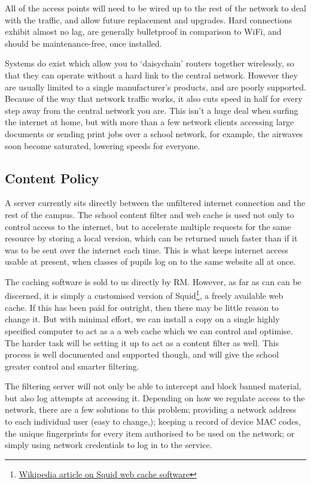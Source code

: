 \documentclass[a4paper,leqno,titlepage]{article}
\begin{document}
All of the access points will need to be wired up to the rest of the network
to deal with the traffic, and allow future replacement and upgrades.
Hard connections exhibit almost no lag, are generally bulletproof in
comparison to WiFi, and should be maintenance-free, once installed.


Systems do exist which allow you to `daisychain' routers together wirelessly,
so that they can operate without a hard link to the central network. However
they are usually limited to a single manufacturer's products,
and are poorly supported. Because of the way that network traffic works,
it also cuts speed in half for every step away from the central network you are.
This isn't a huge deal when surfing the internet at home,
but with more than a few network clients accessing large documents or sending
print jobs over a school network, for example,
the airwaves soon become saturated, lowering speeds for everyone.


\subsection{Content Policy}

A server currently sits directly between the unfiltered internet connection and
the rest of the campus. The school content filter and web cache is used not only
to control access to the internet, but to accelerate multiple requests for the
same resource by storing a local version, which can be returned much faster than
if it was to be sent over the internet each time. This is what keeps internet
access usable at present, when classes of pupils log on to the same website
all at once.


The caching software is sold to us directly by RM. However, as far as can can
be discerned, it is simply a customised version of
Squid\footnote{\href{http://en.wikipedia.org/wiki/Squid_(software)}{Wikipedia article on Squid web cache software}},
a freely available web cache. If this has been paid for outright, then there
may be little reason to change it. But with minimal effort, we can install a
copy on a single highly specified computer to act as a a web cache which we
can control and optimise. The harder task will be setting it up to act as a
content filter as well. This process is well documented and supported though,
and will give the school greater control and smarter filtering.



The filtering server will not only be able to intercept and block banned
material, but also log attempts at accessing it. Depending on how we regulate
access to the network, there are a few solutions to this problem;
providing a network address to each individual user (easy to change,);
keeping a record of device MAC codes, the unique fingerprints for every item
authorised to be used on the network;
or simply using network credentials to log in to the service.
\end{document}
